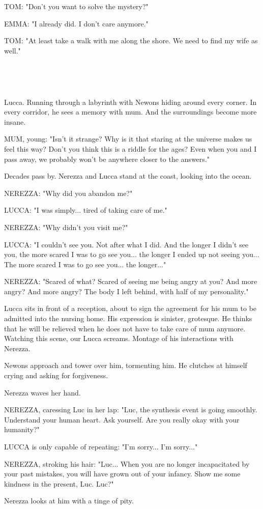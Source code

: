 \documentclass[11pt]{article}
\begin{document}
TOM: "Don't you want to solve the mystery?"

EMMA: "I already did. I don't care anymore."

TOM: "At least take a walk with me along the shore.
We need to find my wife as well."

\ 

\ 

Lucca.
Running through a labyrinth with Newons hiding around every corner.
In every corridor, he sees a memory with mum.
And the surroundings become more insane.

MUM, young: "Isn't it strange?
Why is it that staring at the universe makes us feel this way?
Don't you think this is a riddle for the ages?
Even when you and I pass away, we probably won't be anywhere closer to the answers."

Decades pass by.
Nerezza and Lucca stand at the coast, looking into the ocean.

NEREZZA: "Why did you abandon me?"

LUCCA: "I was simply... tired of taking care of me."

NEREZZA: "Why didn't you visit me?"

LUCCA: "I couldn't see you. Not after what I did.
And the longer I didn't see you, the more scared I was to go see you...
the longer I ended up not seeing you...
The more scared I was to go see you...
the longer..."

NEREZZA: "Scared of what?
Scared of seeing me being angry at you?
And more angry?
And more angry?
The body I left behind, with half of my personality."

Lucca sits in front of a reception, about to sign the agreement for his mum to be admitted into the nursing home.
His expression is sinister, grotesque.
He thinks that he will be relieved when he does not have to take care of mum anymore.
Watching this scene, our Lucca screams. 
Montage of his interactions with Nerezza.

Newons approach and tower over him, tormenting him.
He clutches at himself crying and asking for forgiveness.

Nerezza waves her hand.

NEREZZA, caressing Luc in her lap: "Luc, the synthesis event is going smoothly.
Understand your human heart.
Ask yourself.
Are you really okay with your humanity?"

LUCCA is only capable of repeating: "I'm sorry... 
I'm sorry..."

NEREZZA, stroking his hair: "Luc... 
When you are no longer incapacitated by your past mistakes, you will have grown out of your infancy.
Show me some kindness in the present, Luc.
Luc?"

Nerezza looks at him with a tinge of pity.
\end{document}
